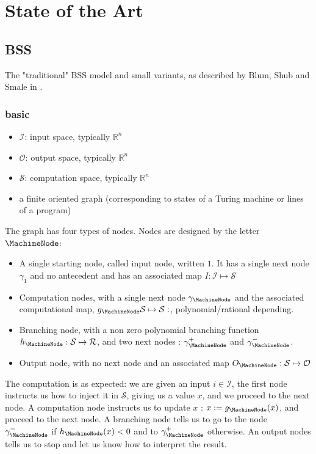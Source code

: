 \section{State of the Art}
\subsection{BSS}

The "traditional" BSS model and small variants, as described by Blum, Shub and Smale in \cite{blum1989}.

\subsubsection{basic}

\begin{itemize}
	\item $\mathcal{I}$: input space, typically $\mathbb{R}^n$
	\item $\mathcal{O}$: output space, typically $\mathbb{R}^n$
	\item $\mathcal{S}$: computation space, typically $\mathbb{R}^n$
	\item a finite oriented graph (corresponding to states of a Turing machine or lines of a program)
\end{itemize}

The graph has four types of nodes. Nodes are designed by the letter $\MachineNode$:

\begin{itemize}
	\item A single starting node, called input node, written $1$.
	It has a single next node $\gamma_1$ and no antecedent and has an associated map $ I : \mathcal{I} \mapsto \mathcal{S}$
	\item Computation nodes, with a single next node $\gamma_{\MachineNode}$ and the associated computational map, $g_{\MachineNode} \mathcal{S} \mapsto \mathcal{S}: $, polynomial/rational depending.
	\item Branching node, with a non zero polynomial branching function $h_{\MachineNode} : \mathcal{S} \mapsto \mathcal{R}$, and two next nodes : $\gamma^+_{\MachineNode}$ and $\gamma^-_{\MachineNode}$.
	\item Output node, with no next node and an associated map $ O_{\MachineNode} : \mathcal{S} \mapsto \mathcal{O}$
\end{itemize}

The computation is as expected: we are given an input $i\in\mathcal{I}$, the first node instructs us how to inject it in $\mathcal{S}$, giving us a value $x$, and we proceed to the next node.
A computation node instructs us to update $x$ : $x := g_{\MachineNode}(x)$, and proceed to the next node.
A branching node tells us to go to the node $\gamma^-_{\MachineNode}$ if $h_{\MachineNode}(x) < 0$ and to $\gamma^+_{\MachineNode}$ otherwise.
An output nodes tells us to stop and let us know how to interpret the result.


